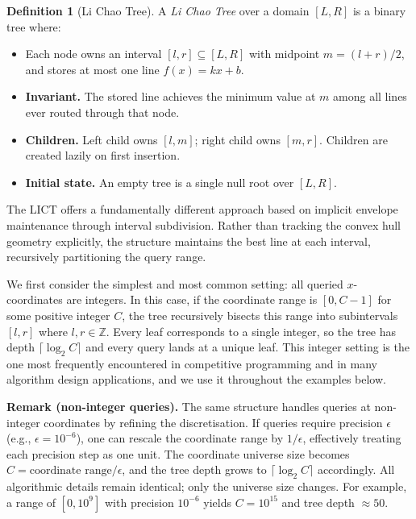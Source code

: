 \documentclass[11pt,a4paper]{article}
\theoremstyle{definition}
\newtheorem{definition}{Definition}
\theoremstyle{plain}
\begin{document}
\begin{definition}[Li Chao Tree]\label{def:lict}
A \emph{Li Chao Tree} over a domain $[L, R]$ is a binary tree where:
\begin{itemize}
  \item Each node owns an interval $[l, r] \subseteq [L, R]$ with midpoint $m = (l+r)/2$, and stores at most one line $f(x) = kx + b$.
  \item \textbf{Invariant.} The stored line achieves the minimum value at $m$ among all lines ever routed through that node.
  \item \textbf{Children.} Left child owns $[l, m]$; right child owns $[m, r]$. Children are created lazily on first insertion.
  \item \textbf{Initial state.} An empty tree is a single null root over $[L, R]$.
\end{itemize}
\end{definition}

The LICT offers a fundamentally different approach based on implicit envelope maintenance through interval subdivision. Rather than tracking the convex hull geometry explicitly, the structure maintains the best line at each interval, recursively partitioning the query range.

We first consider the simplest and most common setting: all queried $x$-coordinates are integers. In this case, if the coordinate range is $[0, C-1]$ for some positive integer $C$, the tree recursively bisects this range into subintervals $[l, r]$ where $l, r \in \mathbb{Z}$. Every leaf corresponds to a single integer, so the tree has depth $\lceil \log_2 C \rceil$ and every query lands at a unique leaf. This integer setting is the one most frequently encountered in competitive programming and in many algorithm design applications, and we use it throughout the examples below.

\textbf{Remark (non-integer queries).} The same structure handles queries at non-integer coordinates by refining the discretisation. If queries require precision $\epsilon$ (e.g., $\epsilon = 10^{-6}$), one can rescale the coordinate range by $1/\epsilon$, effectively treating each precision step as one unit. The coordinate universe size becomes $C = \text{coordinate range} / \epsilon$, and the tree depth grows to $\lceil \log_2 C \rceil$ accordingly. All algorithmic details remain identical; only the universe size changes. For example, a range of $[0, 10^9]$ with precision $10^{-6}$ yields $C = 10^{15}$ and tree depth $\approx 50$.
\end{document}
